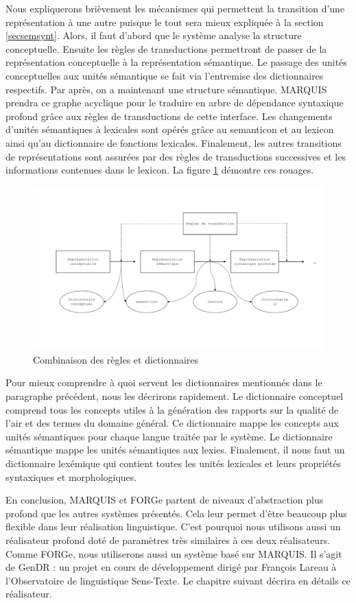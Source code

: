 Nous expliquerons brièvement les mécanismes qui permettent la transition d'une représentation à une autre puisque le tout sera mieux expliquée à la section \ref{secsemsynt}. Alors, il faut d'abord que le système analyse la structure conceptuelle. Ensuite les règles de transductions permettront de passer de la représentation conceptuelle à la représentation sémantique. Le passage des unités conceptuelles aux unités sémantique se fait via l'entremise des dictionnaires respectifs. Par après, on a maintenant une structure sémantique. MARQUIS prendra ce graphe acyclique pour le traduire en arbre de dépendance syntaxique profond grâce aux règles de transductions de cette interface. Les changements d'unités sémantiques à lexicales sont opérés grâce au semanticon et au lexicon ainsi qu'au dictionnaire de fonctions lexicales. Finalement, les autres transitions de représentations sont assurées par des règles de transductions successives et les informations contenues dans le lexicon. La figure \ref{fig:reglesdict} démontre ces rouages.
\begin{figure}[htb]
	\centering
	\includegraphics[width=1\textwidth, trim = {0cm 0cm 0cm 0cm},clip]{ch2/figs/module.pdf}
	\caption{Combinaison des règles et dictionnaires}
	\label{fig:reglesdict}
\end{figure}

Pour mieux comprendre à quoi servent les dictionnaires mentionnés dans le paragraphe précédent, nous les décrirons rapidement. Le dictionnaire conceptuel comprend tous les concepts utiles à la génération des rapports sur la qualité de l'air et des termes du domaine général. Ce dictionnaire mappe les concepts aux unités sémantiques pour chaque langue traitée par le système. Le dictionnaire sémantique mappe les unités sémantiques aux lexies. Finalement, il nous faut un dictionnaire lexémique qui contient toutes les unités lexicales et leurs propriétés syntaxiques et morphologiques.

En conclusion, MARQUIS et FORGe partent de niveaux d'abstraction plus profond que les autres systèmes présentés. Cela leur permet d'être beaucoup plus flexible dans leur réalisation linguistique. C'est pourquoi nous utilisons aussi un réalisateur profond doté de paramètres très similaires à ces deux réalisateurs. Comme FORGe, nous utiliserons aussi un système basé sur MARQUIS. Il s'agit de GenDR \citep{lareau18}: un projet en cours de développement dirigé par François Lareau à l’Observatoire de linguistique Sens-Texte. Le chapitre suivant décrira en détails ce réalisateur.